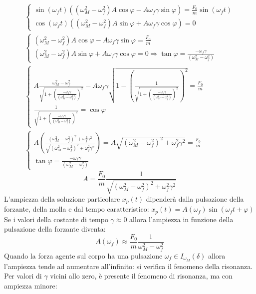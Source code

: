 \documentclass{article}
\numberwithin{equation}{subsection}
\begin{document}
\begin{gather*}
    \begin{cases}
        \sin(\omega_f t)((\omega_M^{2}-\omega_f^{2})A\cos\varphi-A\omega_f\gamma \sin\varphi)=\displaystyle\frac{F_0}{m}\sin(\omega_f t)\\
        \cos(\omega_f t)((\omega_M^{2}-\omega_f^{2})A\sin\varphi+A\omega_f\gamma \cos\varphi)=0
    \end{cases}\\
    \begin{cases}
        (\omega_M^{2}-\omega_f^{2})A\cos\varphi-A\omega_f\gamma \sin\varphi=\displaystyle\frac{F_0}{m}\\
        (\omega_M^{2}-\omega_f^{2})A\sin\varphi+A\omega_f\gamma \cos\varphi=0\Rightarrow\displaystyle \tan\varphi=\frac{-\omega_f\gamma}{(\omega_M^{2}-\omega_f^{2})}
    \end{cases}\\
    \begin{cases}
        \displaystyle A\frac{\omega_M^{2}-\omega_f^{2}}{\sqrt{1+\left(\frac{-\omega_f\gamma}{(\omega_M^{2}-\omega_f^{2})}\right)^{2}}}-A\omega_f\gamma\sqrt{1-\left(\displaystyle\frac{1}{\sqrt{1+\left(\frac{-\omega_f\gamma}{(\omega_M^{2}-\omega_f^{2})}\right)^{2}}}\right)^{2}}=\frac{F_0}{m}\\
        \displaystyle\frac{1}{\sqrt{1+\left(\frac{-\omega_f\gamma}{(\omega_M^{2}-\omega_f^{2})}\right)^{2}}}=\cos\varphi
    \end{cases}\\
    \begin{cases}
        A\left(\displaystyle\frac{(\omega_M^{2}-\omega_f^{2})^{2}+\omega_f^{2}\gamma^{2}}{\sqrt{(\omega_M^{2}-\omega_f^{2})^{2}+\omega_f^{2}\gamma^{2}}}\right)=A\sqrt{(\omega_M^{2}-\omega_f^{2})^{2}+\omega_f^{2}\gamma^{2}}=\displaystyle\frac{F_0}{m} \\
        \tan\varphi=\displaystyle\frac{-\omega_f\gamma}{(\omega_M^{2}-\omega_f^{2})}
    \end{cases}
\end{gather*}
\begin{equation}
    A=\frac{F_0}{m}\frac{1}{\sqrt{(\omega_M^{2}-\omega_f^{2})^{2}+\omega_f^{2}\gamma^{2}}}
\end{equation}
L'ampiezza della soluzione particolare $x_p(t)$ dipenderà 
dalla pulsazione della forzante, della molla e dal tempo 
caratteristico: $x_p(t)=A(\omega_f)\sin(\omega_f t+\varphi)$ \\
Se i valori della costante di tempo $\gamma\approx0$ allora 
l'ampiezza in funzione della pulsazione della forzante diventa:
\begin{equation}
    A(\omega_f)\approx\displaystyle\frac{F_0}{m}\frac{1}{\omega_M^{2}-\omega_f^{2}}
\end{equation}
Quando la forza agente sul corpo ha una pulsazione 
$\omega_f\in I_{\omega_M}(\delta)$ allora l'ampiezza tende 
ad aumentare all'infinito: si verifica il fenomeno della 
risonanza. Per valori di $\gamma$ vicini allo zero, è presente 
il fenomeno di risonanza, ma con ampiezza minore:
\end{document}

